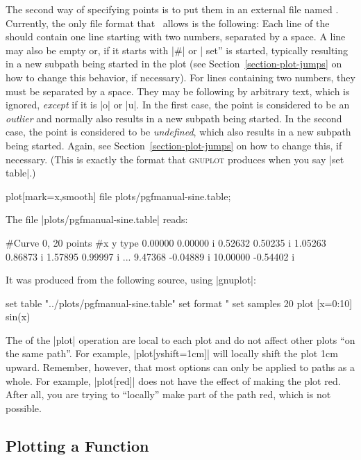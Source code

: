 The second way of specifying points is to put them in an external file named
. Currently, the only file format that \tikzname\ allows is the
following: Each line of the  should contain one line starting
with two numbers, separated by a space. A line may also be empty or, if it
starts with |#| or |%
set'' is started, typically resulting in a new subpath being started in the
plot (see Section~\ref{section-plot-jumps} on how to change this behavior, if
necessary). For lines containing two numbers, they must be separated by a
space. They may be following by arbitrary text, which is ignored, \emph{except}
if it is |o| or |u|. In the first case, the point is considered to be an
\emph{outlier} and normally also results in a new subpath being started. In the
second case, the point is considered to be \emph{undefined}, which also results
in a new subpath being started. Again, see Section~\ref{section-plot-jumps} on
how to change this, if necessary. (This is exactly the format that
\textsc{gnuplot} produces when you say |set table|.)
%
\begin{codeexample}[]
\tikz \draw plot[mark=x,smooth] file {plots/pgfmanual-sine.table};
\end{codeexample}

The file |plots/pgfmanual-sine.table| reads:
%
\begin{codeexample}
#Curve 0, 20 points
#x y type
0.00000 0.00000  i
0.52632 0.50235  i
1.05263 0.86873  i
1.57895 0.99997  i
...
9.47368 -0.04889  i
10.00000 -0.54402  i
\end{codeexample}
%
It was produced from the following source, using |gnuplot|:
%
\begin{codeexample}
set table  "../plots/pgfmanual-sine.table"
set format "%
set samples 20
plot [x=0:10] sin(x)
\end{codeexample}

The  of the |plot| operation are local to each plot and do
not affect other plots ``on the same path''. For example, |plot[yshift=1cm]|
will locally shift the plot 1cm upward. Remember, however, that most options
can only be applied to paths as a whole. For example, |plot[red]| does not have
the effect of making the plot red. After all, you are trying to ``locally''
make part of the path red, which is not possible.


\subsection{Plotting a Function}
\label{section-tikz-plot}

